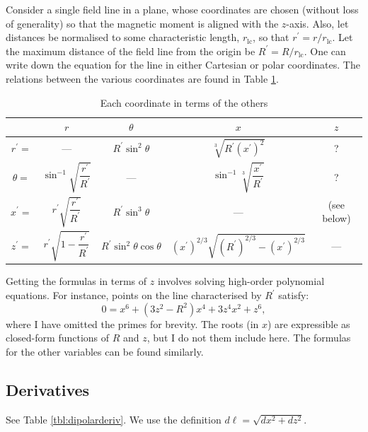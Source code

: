 \documentclass{book}
\newcommand{\rL}{r_\text{lc}} %
\begin{document}
Consider a single field line in a plane, whose coordinates are chosen (without loss of generality) so that the magnetic moment is aligned with the $z$-axis.
Also, let distances be normalised to some characteristic length, $\rL$, so that $r^\prime = r/\rL$.
Let the maximum distance of the field line from the origin be $R^\prime = R/\rL$.
One can write down the equation for the line in either Cartesian or polar coordinates.
The relations between the various coordinates are found in Table \ref{tbl:dipolar}.
\begin{table}[!ht]
    \centering
    \caption{Each coordinate in terms of the others}
    \label{tbl:dipolar}
    \begin{tabular}{c|cccc}
        & $r$ & $\theta$ & $x$ & $z$ \\[5pt]
        \hline
        $r^\prime =$ & --- & $R^\prime\sin^2\theta$ & $\sqrt[3]{R^\prime (x^\prime)^2}$ & ? \\[8pt]
        $\theta =$   & $\sin^{-1}\sqrt{\dfrac{r^\prime}{R^\prime}}$ & --- & $\sin^{-1}\sqrt[3]{\dfrac{x^\prime}{R^\prime}}$ & ? \\[8pt]
        $x^\prime =$ & $r^\prime\sqrt{\dfrac{r^\prime}{R^\prime}}$ & $R^\prime\sin^3\theta$ & --- & (see below) \\[8pt]
        $z^\prime =$ & $r^\prime\sqrt{1-\dfrac{r^\prime}{R^\prime}}$ & $R^\prime\sin^2\theta\cos\theta$ & $(x^\prime)^{2/3} \sqrt{(R^\prime)^{2/3} - (x^\prime)^{2/3}}$ & ---
    \end{tabular}
\end{table}

Getting the formulas in terms of $z$ involves solving high-order polynomial equations.
For instance, points on the line characterised by $R^\prime$ satisfy:
\begin{equation}
    0 = x^6 + (3z^2 - R^2)x^4 + 3z^4x^2 + z^6,
\end{equation}
where I have omitted the primes for brevity.
The roots (in $x$) are expressible as closed-form functions of $R$ and $z$, but I do not them include here.
The formulas for the other variables can be found similarly.

\subsection{Derivatives}

See Table \ref{tbl:dipolarderiv}.
We use the definition $d\ell = \sqrt{dx^2+dz^2}$.
\end{document}
